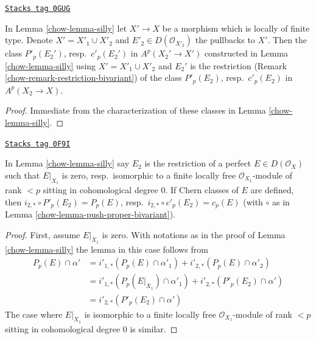 \begin{lemma}
\label{chow-lemma-base-change-silly}
\href{https://stacks.math.columbia.edu/tag/0GUG}{\texttt{Stacks tag 0GUG}}

In Lemma \ref{chow-lemma-silly} let $X' \to X$ be a morphism
which is locally of finite type. Denote $X' = X'_1 \cup X'_2$
and $E'_2 \in D(\mathcal{O}_{X'_2})$ the pullbacks to $X'$.
Then the class $P'_p(E_2')$, resp.\ $c'_p(E_2')$ in
$A^p(X_2' \to X')$ constructed in Lemma \ref{chow-lemma-silly} using
$X' = X'_1 \cup X'_2$ and $E_2'$ is the restriction
(Remark \ref{chow-remark-restriction-bivariant})
of the class $P'_p(E_2)$, resp.\ $c'_p(E_2)$ in $A^p(X_2 \to X)$.
\end{lemma}

\begin{proof}

Immediate from the characterization of these classes in
Lemma \ref{chow-lemma-silly}.
\end{proof}

\begin{lemma}
\label{chow-lemma-silly-silly}
\href{https://stacks.math.columbia.edu/tag/0F9I}{\texttt{Stacks tag 0F9I}}

In Lemma \ref{chow-lemma-silly} say $E_2$ is the restriction of a
perfect $E \in D(\mathcal{O}_X)$ such that $E|_{X_1}$ is zero,
resp.\ isomorphic to a finite locally free $\mathcal{O}_{X_1}$-module
of rank $< p$ sitting in cohomological degree $0$.
If Chern classes of $E$ are defined, then
$i_{2, *} \circ P'_p(E_2) = P_p(E)$,
resp.\ $i_{2, *} \circ c'_p(E_2) = c_p(E)$
(with $\circ$ as in Lemma \ref{chow-lemma-push-proper-bivariant}).
\end{lemma}

\begin{proof}

First, assume $E|_{X_1}$ is zero.
With notations as in the proof of Lemma \ref{chow-lemma-silly}
the lemma in this case follows from
\begin{align*}
P_p(E) \cap \alpha'
& =
i'_{1, *}(P_p(E) \cap \alpha'_1) +
i'_{2, *}(P_p(E) \cap \alpha'_2) \\
& =
i'_{1, *}(P_p(E|_{X_1}) \cap \alpha'_1) +
i'_{2, *}(P'_p(E_2) \cap \alpha') \\
& =
i'_{2, *}(P'_p(E_2) \cap \alpha')
\end{align*}
The case where $E|_{X_1}$ is isomorphic to a finite locally free
$\mathcal{O}_{X_1}$-module of rank $< p$ sitting in cohomological degree $0$
is similar.
\end{proof}

